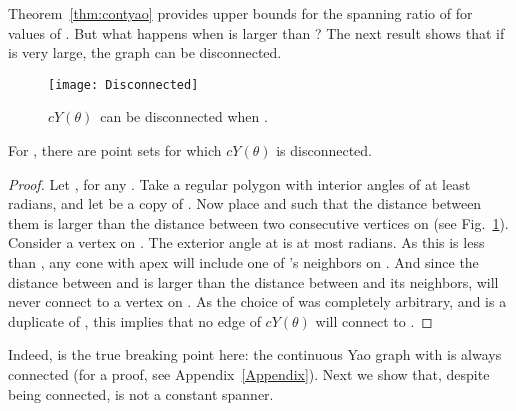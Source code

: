 \documentclass{cccg14}
\newcommand{\cyao}{\ensuremath{cY(\theta)}\xspace}
\begin{document}
\vspace{-0.5em}
Theorem~\ref{thm:contyao} provides upper bounds for the spanning ratio of  for values of .
But what happens when  is larger than ?
The next result shows that if  is very large, the graph can be disconnected.

\begin{figure}[ht]
 \centering
 \texttt{[image: Disconnected]}
 \caption{\small  \cyao\ can be disconnected when .}
 \label{fig:Disconnected}
\end{figure}

\vspace{-0.5em}
\begin{theorem}
 For , there are point sets for which \cyao is disconnected.
\end{theorem}
\begin{proof}
 Let , for any . Take a regular polygon  with interior angles of at least  radians, and let  be a copy of . Now place  and  such that the distance between them is larger than the distance between two consecutive vertices on  (see Fig.~\ref{fig:Disconnected}). Consider a vertex  on . The exterior angle at  is at most  radians. As this is less than , any cone with apex  will include one of 's neighbors on . And since the distance between  and  is larger than the distance between  and its neighbors,  will never connect to a vertex on . As the choice of  was completely arbitrary, and  is a duplicate of , this implies that no edge of \cyao will connect  to .
\end{proof}


Indeed,  is the true breaking point here: the continuous Yao graph with  is always connected (for a proof, see Appendix~\ref{Appendix}).
Next we show that, despite being connected,  is not a constant spanner.
\end{document}
